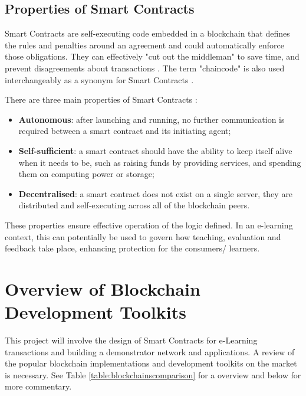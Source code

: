 \subsection{Properties of Smart Contracts}
Smart Contracts are self-executing code embedded in a blockchain that defines the rules and penalties around an agreement and 
could automatically enforce those obligations. They can effectively "cut out the middleman" to save time, and prevent disagreements 
about transactions \citep{gulhane2017ibm}. The term "chaincode" is also used interchangeably as a synonym for 
Smart Contracts \citep[p.6]{valenta2017comparison}.

There are three main properties of Smart Contracts \citep[p.16]{swan2015blockchain}:

\begin{itemize}
    \setlength\itemsep{0em}        
    \item \textbf{Autonomous}: after launching and running, no further communication is required between a smart contract 
    and its initiating agent;
    \item \textbf{Self-sufficient}: a smart contract should have the ability to keep itself alive when it needs to be, 
    such as raising funds by providing services, and spending them on computing power or storage;
    \item \textbf{Decentralised}: a smart contract does not exist on a single server, they are distributed and self-executing 
    across all of the blockchain peers.
\end{itemize}

These properties ensure effective operation of the logic defined. In an e-learning context, this can potentially 
be used to govern how teaching, evaluation and feedback take place, enhancing protection for the consumers/ learners.

\section{Overview of Blockchain Development Toolkits}

This project will involve the design of Smart Contracts for e-Learning transactions and building a demonstrator 
network and applications. A review of the popular blockchain implementations and development toolkits on the 
market is necessary. See Table \ref{table:blockchainscomparison} for a overview and below for more commentary.


